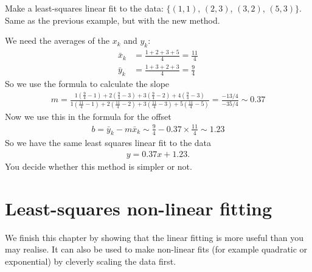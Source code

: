 \exemple{\upline}
{
	Make a least-squares linear fit to the data: $\{ (1,1)$, $(2,3)$, $(3,2)$, $(5,3) \}$. Same as the previous example, but with the new method.
	
	\noindent We need the averages of the $x_k$ and $y_k$:
	\begin{align*}
	\bar{x}_k &= \frac{1+2+3+5}{4} = \frac{11}{4} \\
	\bar{y}_k &= \frac{1+3+2+3}{4} = \frac{9}{4} 
	\end{align*}
	So we use the formula to calculate the slope
	\begin{align*}
	m   = \frac{1(\frac{9}{4}-1)+2(\frac{9}{4}-3)+3(\frac{9}{4}-2)+4(\frac{9}{4}-3)}{1(\frac{11}{4}-1)+2(\frac{11}{4}-2)+3(\frac{11}{4}-3)+5(\frac{11}{4}-5)} = \frac{-13/4}{-35/4} \sim 0.37
	\end{align*}
	Now we use this in the formula for the offset
	\begin{align*}
	b = \bar{y}_k - m \bar{x}_k \sim \frac{9}{4}  - 0.37 \times \frac{11}{4} \sim 1.23
	\end{align*}
	So we have the same least squares linear fit to the data
	\begin{align*}
	y = 0.37 x + 1.23.
	\end{align*}
	You decide whether this method is simpler or not.
}{\downline}


\section{Least-squares non-linear fitting}
We finish this chapter by showing that the linear fitting is more useful than you may realise. It can also be used to make non-linear fits (for example quadratic or exponential) by cleverly scaling the data first. 






